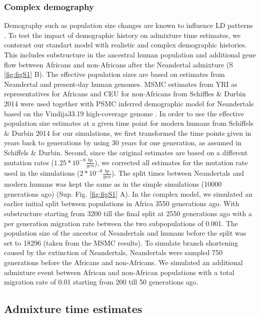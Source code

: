 \documentclass[]{article}
\begin{document}
\subsubsection{Complex demography}\label{inferred demography}

Demography such as population size changes are known to influence LD
patterns \citep{gravel_population_2012,liang_lengths_2014}. To test the impact of
demographic history on admixture time estimates, we contsrast our standart model with
realistic and complex demographic histories. This includes substructure in the ancestral human population and additional gene flow between Africans and non-Africans after the Neandertal admixture (S \ref{fig:figS1} B). The 
effective population
sizes are based on estimates from Neandertal and present-day human
genomes. MSMC estimates from YRI as representatives for Africans and CEU
for non-Africans from Schiffles \& Durbin 2014
\citep{schiffels_inferring_2014} were used together with PSMC
\citep{li_inference_2011} inferred demographic model for Neandertals
based on the Vindija33.19 high-coverage genome
\citep{mafessoni_high_coverage_2020}. In order to use the effective
population size estimates at a given time point for modern humans from
Schiffels \& Durbin 2014 for our simulations, we
first transformed the time points given in years back to generations by
using 30 years for one generation, as assumed in Schiffels \& Durbin.
Second, since the original estimates are based on a different mutation
rates (\(1.25*10^{-8} \frac{bp}{gen}\)), we corrected all estimates for
the mutation rate used in the simulations
(\(2*10^{-8} \frac{bp}{gen}\)). The split times between Neandertals and
modern humans was kept the
same as in the simple simulations (10000 generations ago) (Sup. Fig. \ref{fig:figS1} A). In the complex model, we simulated an earlier initial split between populations in Africa 3550 generations ago. With substructure starting from 3200 till the final split at 2550 generations ago with a per generation migration rate between the two subpopulations of 0.001. The population size of the ancestor of Neandertals and
humans before the split was set to 18296 (taken from the MSMC results). To simulate branch shortening
caused by the extinction of Neandertals, Neandertals were sampled 750
generations before the Africans and non-Africans. We simulated an additional admixture event between African and non-African populations with a total migration rate of 0.01 starting from 200 till 50 generations ago.

\subsection{Admixture time estimates}\label{admixture time estimates}
\end{document}
